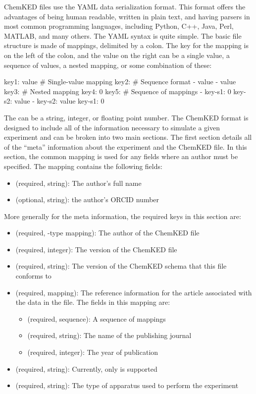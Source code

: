 \documentclass[12pt]{ussci}
\newcommand\ck{ChemKED}
\begin{document}
\ck{} files use the YAML data serialization format. This format offers the
advantages of being human readable, written in plain text, and having parsers in
most common programming languages, including Python, C++, Java, Perl, MATLAB,
and many others. The YAML syntax is quite simple. The basic file structure is
made of mappings, delimited by a colon. The key for the mapping is on the left
of the colon, and the value on the right can be a single value, a sequence of
values, a nested mapping, or some combination of these:
%
\begin{yamlbox}
key1: value  # Single-value mapping
key2:  # Sequence format
  - value
  - value
key3:  # Nested mapping
  key4: 0
key5:  # Sequence of mappings
  - key-s1: 0
    key-s2: value
  - key-s2: value
    key-s1: 0
\end{yamlbox}

The  can be a string, integer, or floating point number. The \ck{}
format is designed to include all of the information necessary to simulate a
given experiment and can be broken into two main sections. The first section
details all of the ``meta'' information about the experiment and the \ck{} file.
In this section, the common  mapping is used for any fields where
an author must be specified. The  mapping contains the following
fields:
%
\begin{itemize}
    \item {} (required, string): The author's full name
    \item {} (optional, string): the author's ORCID number
\end{itemize}
%
More generally for the meta information, the required keys in this section
are:
%
\begin{itemize}
    \item {} (required, -type mapping): The
    author of the \ck{} file
    \item {} (required, integer): The version of the \ck{}
    file
    \item {} (required, string): The version of the \ck{}
    schema that this file conforms to
    \item {} (required, mapping): The reference information for
    the article associated with the data in the file. The fields in this
    mapping are:
    \begin{itemize}
        \item {} (required, sequence): A sequence of 
        mappings
        \item {} (required, string): The name of the publishing
        journal
        \item {} (required, integer): The year of publication
    \end{itemize}
    \item {} (required, string): Currently, only
     is supported
    \item {} (required, string): The type of apparatus used to
    perform the experiment
\end{itemize}
\end{document}
